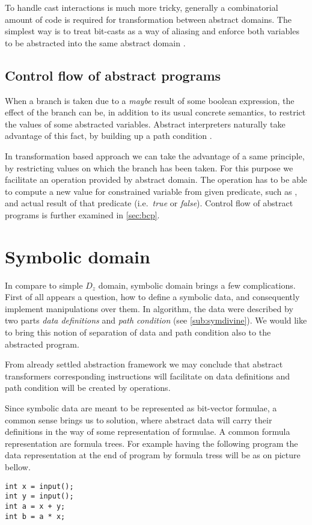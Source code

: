 To handle cast interactions is much more tricky, generally a combinatorial
amount of code is required for transformation between abstract domains. The
simplest way is to treat bit-casts as a way of aliasing and enforce both
variables to be abstracted into the same abstract domain \cite{Rockai15}.


\subsection{Control flow of abstract programs}
When a branch is taken due to a \emph{maybe} result of some boolean expression,
the effect of the branch can be, in addition to its usual concrete semantics,
to restrict the values of some abstracted variables. Abstract interpreters
naturally take advantage of this fact, by building up a path condition
\cite{Rockai15}.

In transformation based approach we can take the advantage of a same principle, by
restricting values on which the branch has been taken. For this purpose we
facilitate an  operation provided by abstract domain. The
 operation has to be able to compute a new value for constrained
variable from given \LLVM predicate, such as , and actual result of
that predicate (i.e.~\emph{true} or \emph{false}). Control flow of abstract
programs is further examined in \autoref{sec:bcp}.

\section{Symbolic domain}\label{sec:sym}

In compare to simple $D_z$ domain, symbolic domain brings a few complications.
First of all appears a question, how to define a symbolic data, and consequently
implement manipulations over them. In \SymDIVINE algorithm, the data were
described by two parts \emph{data definitions} and \emph{path condition} (see
\autoref{sub:symdivine}). We would like to bring this notion of separation of data
and path condition also to the abstracted program.

From already settled abstraction framework we may conclude that abstract
transformers corresponding \LLVM instructions will facilitate on data
definitions and path condition will be created by  operations.

Since symbolic data are meant to be represented as bit-vector formulae,
a common sense brings us to solution, where abstract data will carry their
definitions in the way of some representation of formulae. A common formula
representation are formula trees. For example having the following program the
data representation at the end of program by formula tress will be as on picture bellow.
\begin{verbatim}
int x = input();
int y = input();
int a = x + y;
int b = a * x;
\end{verbatim}

